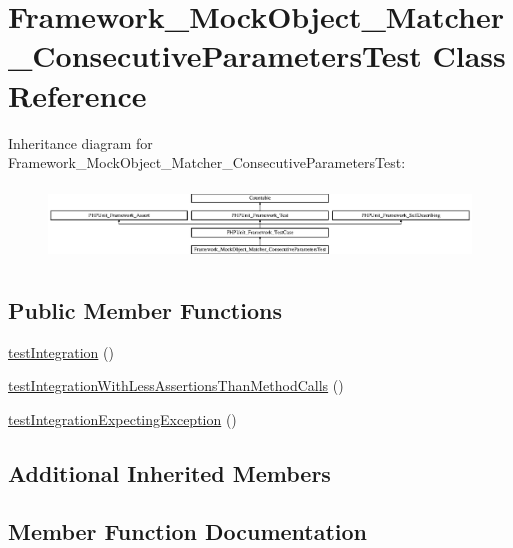 \hypertarget{class_framework___mock_object___matcher___consecutive_parameters_test}{}\section{Framework\+\_\+\+Mock\+Object\+\_\+\+Matcher\+\_\+\+Consecutive\+Parameters\+Test Class Reference}
\label{class_framework___mock_object___matcher___consecutive_parameters_test}
Inheritance diagram for Framework\+\_\+\+Mock\+Object\+\_\+\+Matcher\+\_\+\+Consecutive\+Parameters\+Test\+:\begin{figure}[H]
\begin{center}
\leavevmode
\includegraphics[height=1.985816cm]{class_framework___mock_object___matcher___consecutive_parameters_test}
\end{center}
\end{figure}
\subsection*{Public Member Functions}
\begin{DoxyCompactItemize}
\item 
\mbox{\hyperlink{class_framework___mock_object___matcher___consecutive_parameters_test_a8db0268bc2e5a9006276430a29f2d486}{test\+Integration}} ()
\item 
\mbox{\hyperlink{class_framework___mock_object___matcher___consecutive_parameters_test_af621eab9d126960c8caeef9e32c8114b}{test\+Integration\+With\+Less\+Assertions\+Than\+Method\+Calls}} ()
\item 
\mbox{\hyperlink{class_framework___mock_object___matcher___consecutive_parameters_test_a679900334170eb33c1080ed7b5b59469}{test\+Integration\+Expecting\+Exception}} ()
\end{DoxyCompactItemize}
\subsection*{Additional Inherited Members}


\subsection{Member Function Documentation}
\mbox{\label{class_framework___mock_object___matcher___consecutive_parameters_test_a8db0268bc2e5a9006276430a29f2d486}} 
